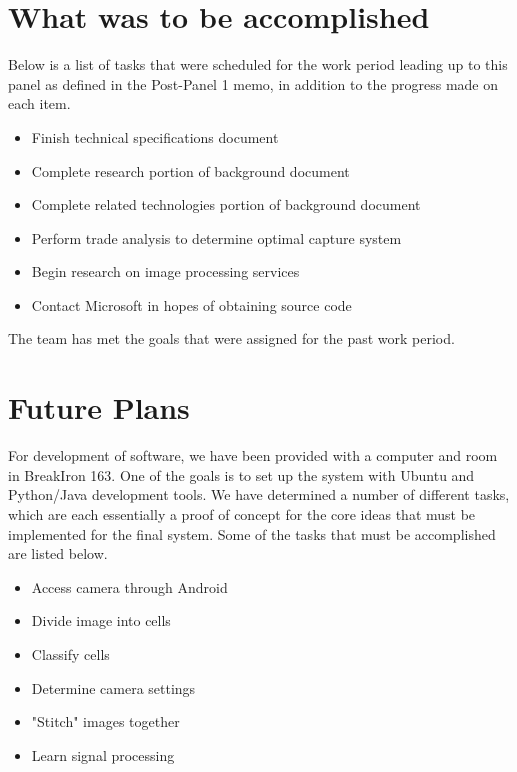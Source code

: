 \documentclass{article}
\begin{document}
    \setlength{\parskip}{0pt}
    \setlength{\parindent}{0pt}
    \thispagestyle{fancy}

	\section*{What was to be accomplished}
		Below is a list of tasks that were scheduled for the work period leading up to this panel as defined in the Post-Panel 1 memo, in addition to the progress made on each item.
		\begin{itemize}
			\item Finish technical specifications document
			\item Complete research portion of background document
			\item Complete related technologies portion of background document
			\item Perform trade analysis to determine optimal capture system 
			\item Begin research on image processing services 
			\item Contact Microsoft in hopes of obtaining source code 
		\end{itemize}
		
		The team has met the goals that were assigned for the past work period.
		
	\section*{Future Plans}
		For development of software, we have been provided with a computer and room in BreakIron 163. One of the goals is to set up the system with Ubuntu and Python/Java development tools. We have determined a number of different tasks, which are each essentially a proof of concept for the core ideas that must be implemented for the final system. Some of the tasks that must be accomplished are listed below.
		
		\begin{itemize}
			\item Access camera through Android
			\item Divide image into cells
			\item Classify cells
			\item Determine camera settings
			\item "Stitch" images together
			\item Learn signal processing
		\end{itemize}
		
	
	
	
	
\end{document}
